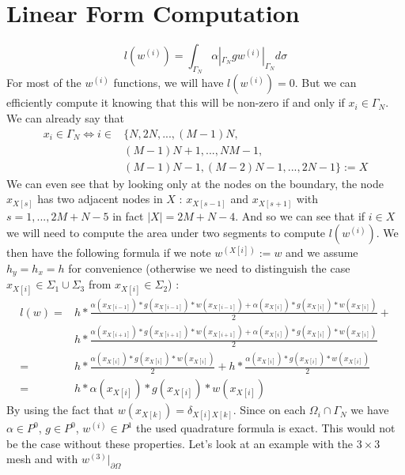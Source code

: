 \documentclass[a4paper]{report}
\begin{document}
\section{Linear Form Computation}
\[
l(w^{(i)})=\int_{\Gamma_N} \alpha |_{\Gamma_N} g w^{(i)}|_{\Gamma_N} d \sigma
\]
For most of the $w^{(i)}$ functions, we will have $l(w^{(i)})=0$. But we can efficiently compute it knowing that this will be non-zero if and only if $x_i \in \Gamma_N$. We can already say that 
\begin{align*}
x_i \in \Gamma_N \iff i \in & \{N,2N,...,(M-1)N,\\
&(M-1)N+1,..., NM-1,\\
   &(M-1)N-1,(M-2)N-1,...,2N-1\}:= X
\end{align*}
We can even see that by looking only at the nodes on the boundary, the node $x_{X[s]}$ has two adjacent nodes in $X$ : 
$x_{X[s-1]}$ and $x_{X [s+1]}$ with $s=1,...,2M+N-5$ in fact $|X | =2M+N-4 $.
And so we can see that if $i\in X$ we will need to compute the area under two segments to compute $l(w^{(i)})$.
We then have the following formula if we note $w^{\left(X[i]\right)}:=w$ and we assume $h_y=h_x=h$ for convenience (otherwise we need to distinguish the case $x_{X[i]} \in \Sigma_1 \cup \Sigma_3$ from $x_{X[i]} \in \Sigma_2 $) :
\begin{align*}
l\left(w\right)=&h*\frac{\alpha(x_{X[i-1]})*g(x_{X[i-1]})*
w(x_{X[i-1]})+\alpha(x_{X[i]})*g(x_{X[i]})*w(x_{X[i]})}{2}+\\
&h*\frac{\alpha(x_{X[i+1]})*g(x_{X[i+1]})*
w(x_{X[i+1]})+\alpha(x_{X[i]})*g(x_{X[i]})*w(x_{X[i]})}{2}\\
=&h*\frac{\alpha(x_{X[i]})*g(x_{X[i]})*w(x_{X[i]})}{2}+h*\frac{\alpha(x_{X[i]})*g(x_{X[i]})*w(x_{X[i]})}{2}\\
=&h*\alpha(x_{X[i]})*g(x_{X[i]})*w(x_{X[i]})
\end{align*}
By using the fact that $w(x_{X[k]})=\delta_{X[i]X[k]}$. Since on each $\Omega_i \cap \Gamma_N$ we have $\alpha \in P^0$, $g \in P^0$, $w^{(i)}\in P^1$ the used quadrature formula is exact. This would not be the case without these properties.  Let's look at an example with the $3 \times 3$ mesh and with $w^{(3)}|_{\partial \Omega}$
\end{document}
